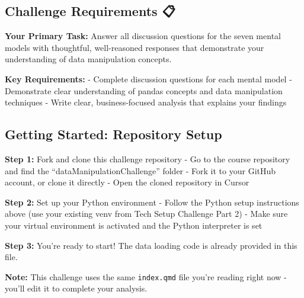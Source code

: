 \documentclass[
  letterpaper,
  DIV=11,
  numbers=noendperiod]{scrartcl}
\begin{document}
\subsection{Challenge Requirements 📋}\label{challenge-requirements}

\textbf{Your Primary Task:} Answer all discussion questions for the
seven mental models with thoughtful, well-reasoned responses that
demonstrate your understanding of data manipulation concepts.

\textbf{Key Requirements:} - Complete discussion questions for each
mental model - Demonstrate clear understanding of pandas concepts and
data manipulation techniques - Write clear, business-focused analysis
that explains your findings

\subsection{Getting Started: Repository Setup
🚀}\label{getting-started-repository-setup}

\begin{tcolorbox}[enhanced jigsaw, colframe=quarto-callout-important-color-frame, title=\textcolor{quarto-callout-important-color}{\faExclamation}\hspace{0.5em}{📁 Getting Started}, breakable, opacityback=0, arc=.35mm, leftrule=.75mm, titlerule=0mm, left=2mm, toptitle=1mm, rightrule=.15mm, bottomtitle=1mm, bottomrule=.15mm, opacitybacktitle=0.6, toprule=.15mm, colback=white, coltitle=black, colbacktitle=quarto-callout-important-color!10!white]

\textbf{Step 1:} Fork and clone this challenge repository - Go to the
course repository and find the ``dataManipulationChallenge'' folder -
Fork it to your GitHub account, or clone it directly - Open the cloned
repository in Cursor

\textbf{Step 2:} Set up your Python environment - Follow the Python
setup instructions above (use your existing venv from Tech Setup
Challenge Part 2) - Make sure your virtual environment is activated and
the Python interpreter is set

\textbf{Step 3:} You're ready to start! The data loading code is already
provided in this file.

\textbf{Note:} This challenge uses the same \texttt{index.qmd} file
you're reading right now - you'll edit it to complete your analysis.

\end{tcolorbox}
\end{document}

